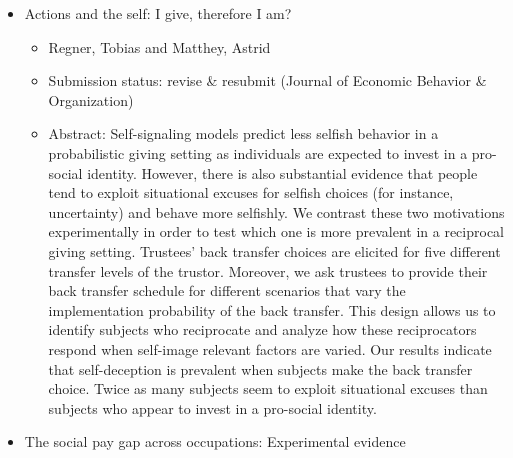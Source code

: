 \documentclass[a4paper,10pt]{article}
\begin{document}
\begin{itemize}
\begin{comment}
\end{itemize}

\end{comment}




\item Actions and the self: I give, therefore I am?

\begin{itemize}
\item Regner, Tobias and Matthey, Astrid 
\item Submission status: revise \& resubmit (Journal of Economic Behavior \& Organization)
\item Abstract: \tiny Self-signaling models predict less selfish behavior in a probabilistic giving setting as individuals are expected to invest in a pro-social identity. However, there is also substantial evidence that people tend to exploit situational excuses for selfish choices (for instance, uncertainty) and behave more selfishly. We contrast these two motivations experimentally in order to test which one is more prevalent in a reciprocal giving setting. Trustees' back transfer choices are elicited for five different transfer levels of the trustor. Moreover, we ask trustees to provide their back transfer schedule for different scenarios that vary the implementation probability of the back transfer. This design allows us to identify subjects who reciprocate and analyze how these reciprocators respond when self-image relevant factors are varied. Our results indicate that self-deception is prevalent when subjects make the back transfer choice. Twice as many subjects seem to exploit situational excuses than subjects who appear to invest in a pro-social identity. 

\end{itemize}
\item The social pay gap across occupations: Experimental evidence


\end{itemize}
\end{document}
